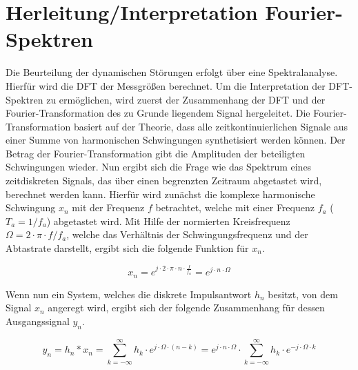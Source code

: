 \section{Herleitung/Interpretation Fourier-Spektren}
Die Beurteilung der dynamischen Störungen erfolgt über eine Spektralanalyse. Hierfür wird die DFT der Messgrößen berechnet. Um die Interpretation der DFT-Spektren zu ermöglichen, wird zuerst der Zusammenhang der DFT und der Fourier-Transformation des zu Grunde liegendem Signal hergeleitet.
Die Fourier-Transformation basiert auf der Theorie, dass alle zeitkontinuierlichen Signale aus einer Summe von harmonischen Schwingungen synthetisiert werden können. Der Betrag der Fourier-Transformation gibt die Amplituden der beteiligten Schwingungen wieder. Nun ergibt sich die Frage wie das Spektrum eines zeitdiskreten Signals, das über einen begrenzten Zeitraum abgetastet wird, berechnet werden kann. Hierfür wird zunächst die komplexe harmonische Schwingung $x_n$ mit der Frequenz $f$ betrachtet, welche mit einer Frequenz $f_a$ ($T_a=1/f_a$) abgetastet wird. Mit Hilfe der normierten Kreisfrequenz $\Omega=2\cdot \pi \cdot f/f_a$, welche das Verhältnis der Schwingungsfrequenz und der Abtastrate darstellt, ergibt sich die folgende Funktion für $x_n$.

\begin{equation}
x_n = e^{j\cdot 2 \cdot \pi \cdot  n \cdot \frac{f}{f_a}} = e^{j\cdot n\cdot \Omega}
\end{equation} 

Wenn nun ein System, welches die diskrete Impulsantwort $h_n$ besitzt, von dem Signal $x_n$ angeregt wird, ergibt sich der folgende Zusammenhang für dessen Ausgangssignal $y_n$.

\begin{equation}
y_n = h_n * x_n = \sum^{\infty}_{k=-\infty}h_k \cdot e^{j\cdot\Omega\cdot(n-k)} = e^{j\cdot n\cdot \Omega} \cdot \sum^{\infty}_{k=-\infty} h_k \cdot e^{-j\cdot \Omega \cdot k}
\end{equation}

